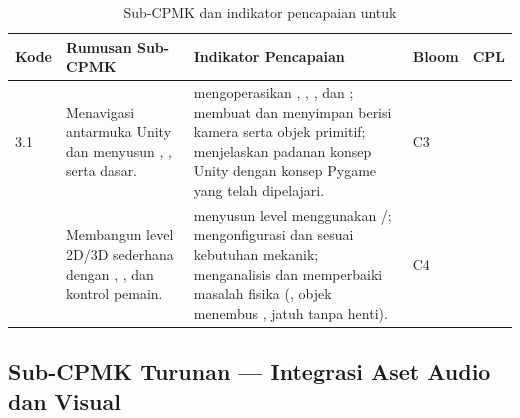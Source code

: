 \begin{table}[htbp]
\centering
\caption{Sub-CPMK dan indikator pencapaian untuk }
\label{tab:subcpmk3}
\begin{tabularx}{\textwidth}{@{}L{1.5cm} L{3.9cm} Y L{1.5cm} L{2.4cm}@{}}
\toprule
\headrow \textbf{Kode} & \textbf{Rumusan Sub-CPMK} & \textbf{Indikator Pencapaian} & \textbf{Bloom} & \textbf{CPL} \\
 &
Menavigasi antarmuka Unity dan menyusun , , serta  dasar. &
 mengoperasikan , , , dan ;
 membuat dan menyimpan  berisi kamera serta objek primitif;
 menjelaskan padanan konsep Unity dengan konsep Pygame yang telah dipelajari. &
C3 &  \\
 &
Membangun level 2D/3D sederhana dengan , , dan kontrol pemain. &
 menyusun level menggunakan /;
 mengonfigurasi  dan  sesuai kebutuhan mekanik;
 menganalisis dan memperbaiki masalah fisika (, objek menembus , jatuh tanpa henti). &
C4 &  \\
\bottomrule
\end{tabularx}
\end{table}

\subsection{Sub-CPMK Turunan  --- Integrasi Aset Audio dan Visual}

